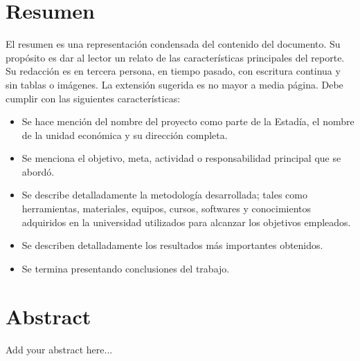 \documentclass[12pt]{article}
\newcommand{\nasesorinstitucional}{Dr. Said Polanco Martagón}
\begin{document}





\clearpage
\ClearWallPaper
\thispagestyle{fancy}
\section*{Resumen}

El resumen es una representación condensada del contenido del documento. Su propósito es dar al lector un relato de las características principales del reporte. Su redacción es en tercera persona, en tiempo pasado, con escritura continua y sin tablas o imágenes. La extensión sugerida es no mayor a media página. Debe cumplir con las siguientes características:

\begin{itemize}
\item Se hace mención del nombre del proyecto como parte de la Estadía, el nombre de la unidad económica y su dirección completa.
\item Se menciona el objetivo, meta, actividad o responsabilidad principal que se abordó.
\item Se describe detalladamente la metodología desarrollada; tales como herramientas, materiales, equipos, cursos, softwares y conocimientos adquiridos en la universidad utilizados para alcanzar los objetivos empleados.
\item Se describen detalladamente los resultados más importantes obtenidos.
\item Se termina presentando conclusiones del trabajo.
\end{itemize}


\clearpage
\thispagestyle{fancy}
\section*{Abstract}
Add your abstract here...

\clearpage

\thispagestyle{empty}
\ClearWallPaper
\tableofcontents
\end{document}
